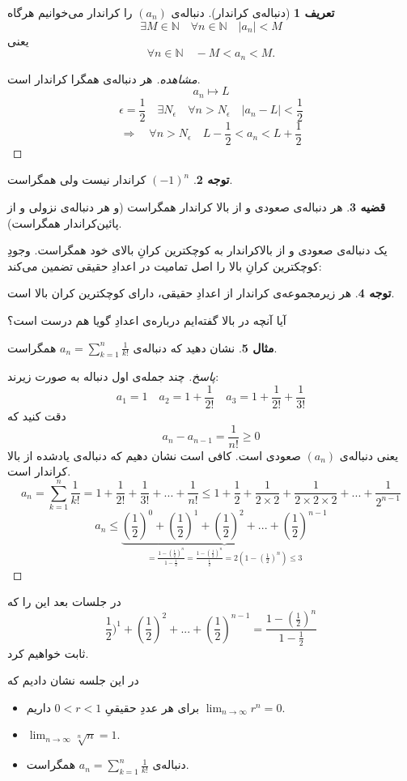 \documentclass[12pt,a4paper]{article}
\theoremstyle{definition}
\newtheorem{thm}{قضیه}
\newtheorem{mesal}[thm]{مثال}
\newtheorem{tav}[thm]{توجه}
\newtheorem{defn}[thm]{تعریف}
\begin{document}
\begin{defn}[دنباله‌ی کراندار]
دنباله‌ی
$(a_n)$
را کراندار می‌خوانیم هرگاه
\[
\exists M \in \mathbb{N} \quad \forall n \in \mathbb{N} \quad |a_n|<M
\]
یعنی
\[
\forall n \in \mathbb{N}\quad 
-M<a_n<M.
\]
\end{defn}
\begin{proof}[مشاهده]
هر دنباله‌ی همگرا کراندار است.
\[
a_n \mapsto L
\]
\[
\epsilon =\frac{1}{2} \quad \exists N_\epsilon \quad \forall n>N_\epsilon \quad |a_n-L|<\frac{1}{2}
\]
\[
\Rightarrow \quad \forall n > N_\epsilon \quad L-\frac{1}{2} <a_n<L+\frac{1}{2}
\]
\end{proof}
\begin{tav}
$(-1)^n$
کراندار نیست ولی همگراست.
\end{tav}
\begin{thm}
هر دنباله‌ی صعودی و از بالا کراندار همگراست (و هر دنباله‌ی نزولی و از پائین‌کراندار همگراست).
\end{thm}
یک دنباله‌ی صعودی و از بالاکراندار به کوچکترین کرانِ بالای خود همگراست. 
وجودِ کوچکترین کرانِ بالا را اصل تمامیت در اعدادِ حقیقی تضمین می‌کند:
\begin{tav}
هر زیرمجموعه‌ی کراندار از اعدادِ حقیقی، دارای کوچکترین کران بالا است.
\end{tav}
آیا آنچه در بالا گفته‌ایم درباره‌ی اعدادِ گویا هم درست است؟
\begin{mesal}
نشان دهید که دنباله‌ی 
$a_n=\sum_{k=1}^n \frac{1}{k!}$
همگراست.
\end{mesal}
\begin{proof}[پاسخ]
چند جمله‌ی اول دنباله به صورت زیرند:
\[
a_1=1 \quad a_2=1+\frac{1}{2!} \quad a_3=1+\frac{1}{2!}+\frac{1}{3!}
\]
دقت کنید که
\[
a_n-a_{n-1}=\frac{1}{n!} \geqslant 0
\]
یعنی دنباله‌ی
$(a_n)$
صعودی است. کافی است نشان دهیم که دنباله‌ی یادشده از بالا کراندار است. 
\[
a_n=\sum_{k=1}^n\frac{1}{k!}=1+\frac{1}{2!}+\frac{1}{3!}+...+\frac{1}{n!} \leqslant 1+\frac{1}{2}+\frac{1}{2\times 2}+\frac{1}{2\times 2\times 2}+...+\frac{1}{2^{n-1}}
\]
\[
a_n \leqslant \underbrace{(\frac{1}{2})^0+(\frac{1}{2})^1+(\frac{1}{2})^2+...+(\frac{1}{2})^{n-1}}_{= \frac{1-(\frac{1}{2})^n}{1-\frac{1}{2}}=\frac{1-(\frac{1}{2})^n}{\frac{1}{2}}=2(1-(\frac{1}{2})^n) \leqslant 3}
\]
\end{proof}
در جلسات بعد این را که
\[
\frac{1}{2})^1+(\frac{1}{2})^2+...+(\frac{1}{2})^{n-1}=\frac{1-(\frac{1}{2})^n}{1-\frac{1}{2}}
\]
ثابت خواهیم کرد.
\begin{framed}
در این جلسه نشان دادیم که
\begin{itemize}
\item 
برای هر عددِ حقیقیِ
$0<r<1$
داریم
$\lim_{n\to \infty} r^n=0$.
\item 
$ \lim_{n\to \infty}\sqrt[n]{n}=1$.
\item 
دنباله‌ی 
$a_n=\sum_{k=1}^n \frac{1}{k!}$
همگراست.
\end{itemize}

\end{framed}
\end{document}
